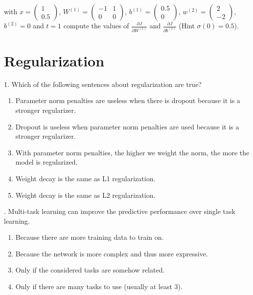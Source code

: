 \noindent with $ x = \begin{pmatrix} 1 \\ 0.5 \end{pmatrix} $, $ W^{(1)} = \begin{pmatrix} -1 & 1 \\ 0 & 0 \end{pmatrix} $, $ b^{(1)} = \begin{pmatrix} 0.5 \\ 0 \end{pmatrix} $, $w^{(2)} = \begin{pmatrix} 2 \\ -2 \end{pmatrix}$, $b^{(2)} = 0$ and $ t=1 $ compute the values of $ \frac{\partial J}{\partial W^{(1)}} $ and $ \frac{\partial J}{\partial b^{(1)}} $ (Hint $\sigma (0) = 0.5$).

\newpage
\section{Regularization}

1. Which of the following sentences about regularization are true?

\begin{enumerate}[label=\roman*]
    \item Parameter norm penalties are useless when there is dropout because it is a stronger regularizer.
    \item Dropout is useless when parameter norm penalties are used because it is a stronger regularizer.
    \item With parameter norm penalties, the higher we weight the norm, the more the model is regularized.
    \item Weight decay is the same as L1 regularization.
    \item Weight decay is the same as L2 regularization.
\end{enumerate}

. Multi-task learning can improve the predictive performance over single task learning.

\begin{enumerate}[label=\roman*]
    \item Because there are more training data to train on.
    \item Because the network is more complex and thus more expressive.
    \item Only if the considered tasks are somehow related.
    \item Only if there are many tasks to use (usually at least 3).
\end{enumerate}

